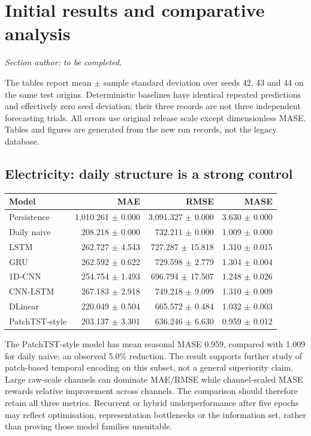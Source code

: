 \documentclass[10pt,a4paper]{article}
\begin{document}
\clearpage
\section{Initial results and comparative analysis}
\noindent\textit{Section author: to be completed.}


The tables report mean $\pm$ sample standard deviation over seeds 42, 43 and 44 on the same test origins. Deterministic baselines have identical repeated predictions and effectively zero seed deviation; their three records are not three independent forecasting trials. All errors use original release scale except dimensionless MASE. Tables and figures are generated from the new run records, not the legacy database.
\subsection{Electricity: daily structure is a strong control}
\begin{center}\small
\begin{tabular}{lrrr}\toprule
Model & MAE & RMSE & MASE\\\midrule
Persistence & 1,010.261 $\pm$ 0.000 & 3,091.327 $\pm$ 0.000 & 3.630 $\pm$ 0.000\\
Daily naive & 208.218 $\pm$ 0.000 & 732.211 $\pm$ 0.000 & 1.009 $\pm$ 0.000\\
LSTM & 262.727 $\pm$ 4.543 & 727.287 $\pm$ 15.818 & 1.310 $\pm$ 0.015\\
GRU & 262.592 $\pm$ 0.622 & 729.598 $\pm$ 2.779 & 1.304 $\pm$ 0.004\\
1D-CNN & 254.754 $\pm$ 1.493 & 696.794 $\pm$ 17.507 & 1.248 $\pm$ 0.026\\
CNN-LSTM & 267.183 $\pm$ 2.918 & 749.218 $\pm$ 9.099 & 1.310 $\pm$ 0.009\\
DLinear & 220.049 $\pm$ 0.504 & 665.572 $\pm$ 0.484 & 1.032 $\pm$ 0.003\\
PatchTST-style & 203.137 $\pm$ 3.301 & 636.246 $\pm$ 6.630 & 0.959 $\pm$ 0.012\\
\bottomrule\end{tabular}\end{center}
The PatchTST-style model has mean seasonal MASE 0.959, compared with 1.009 for daily naive: an observed 5.0\% reduction. 
The result supports further study of patch-based temporal encoding on this subset, not a general superiority claim. Large raw-scale channels can dominate MAE/RMSE while channel-scaled MASE rewards relative improvement across channels. The comparison should therefore retain all three metrics. Recurrent or hybrid underperformance after five epochs may reflect optimisation, representation bottlenecks or the information set, rather than proving those model families unsuitable.
\end{document}
